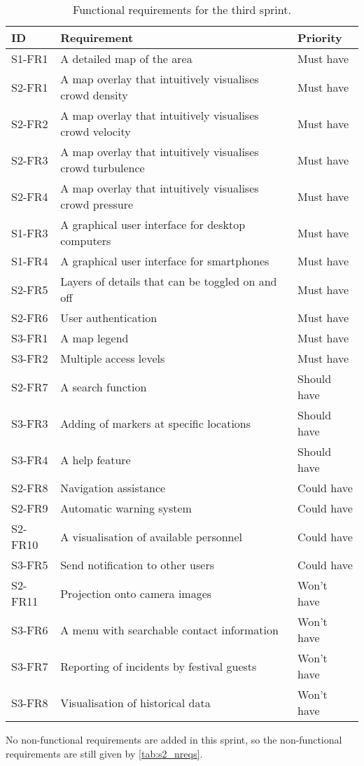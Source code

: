 \begin{table}[htbp]
	\centering
	\begin{tabularx}{\textwidth}{lXl}
		\toprule
		\textbf{ID} & \textbf{Requirement} & \textbf{Priority} \\
		\midrule 
		\rowcolor[HTML]{EFEFEF} 
		S1-FR1 & A detailed map of the area & Must have \\
		S2-FR1 & A map overlay that intuitively visualises crowd density & Must have \\
		\rowcolor[HTML]{EFEFEF} 
		S2-FR2 & A map overlay that intuitively visualises crowd velocity & Must have \\
		S2-FR3 & A map overlay that intuitively visualises crowd turbulence & Must have \\
		\rowcolor[HTML]{EFEFEF} 
		S2-FR4 & A map overlay that intuitively visualises crowd pressure & Must have \\
		S1-FR3 & A graphical user interface for desktop computers & Must have \\
		\rowcolor[HTML]{EFEFEF} 
		S1-FR4 & A graphical user interface for smartphones & Must have \\
		S2-FR5 & Layers of details that can be toggled on and off & Must have \\
		\rowcolor[HTML]{EFEFEF} 
		S2-FR6 & User authentication & Must have \\
		S3-FR1 & A map legend & Must have \\
		\rowcolor[HTML]{EFEFEF}
		S3-FR2 & Multiple access levels & Must have \\
		S2-FR7 & A search function & Should have \\
		\rowcolor[HTML]{EFEFEF}
		S3-FR3 & Adding of markers at specific locations & Should have \\
		S3-FR4 & A help feature & Should have \\
		\rowcolor[HTML]{EFEFEF} 
		S2-FR8 & Navigation assistance & Could have \\
		S2-FR9 & Automatic warning system & Could have \\
		\rowcolor[HTML]{EFEFEF} 
		S2-FR10 & A visualisation of available personnel & Could have \\
		S3-FR5 & Send notification to other users & Could have \\
		\rowcolor[HTML]{EFEFEF}
		S2-FR11 & Projection onto camera images & Won't have \\
		S3-FR6 & A menu with searchable contact information & Won't have \\
		\rowcolor[HTML]{EFEFEF}
		S3-FR7 & Reporting of incidents by festival guests & Won't have \\
		S3-FR8 & Visualisation of historical data & Won't have \\
		\bottomrule
	\end{tabularx}
	\caption{Functional requirements for the third sprint.}
	\label{tab:s3_req}
\end{table}

No non-functional requirements are added in this sprint, so the non-functional requirements are still given by \cref{tab:s2_nreqs}.
